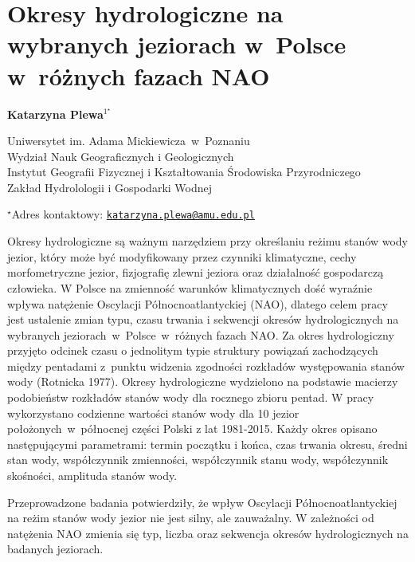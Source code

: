 \documentclass[\main/boa.tex]{subfiles}
\begin{document}
\sloppy


\section{Okresy hydrologiczne na wybranych jeziorach w~Polsce w~różnych fazach NAO}


\begin{center}
  {\bf {} Katarzyna Plewa$^{1^\star}$}
\end{center}

\vskip 0.3cm

\begin{affiliations}
\begin{enumerate}
\begin{minipage}{0.915\textwidth}
\centering
\item Uniwersytet im. Adama Mickiewicza~w~Poznaniu\\ Wydział Nauk Geograficznych i Geologicznych\\ Instytut Geografii Fizycznej i Kształtowania Środowiska Przyrodniczego \\Zakład Hydrolologii i Gospodarki Wodnej
\end{minipage}
\end{enumerate}
$^\star$Adres kontaktowy: \href{mailto:katarzyna.plewa@amu.edu.pl}{\nolinkurl{katarzyna.plewa@amu.edu.pl}}\\
\end{affiliations}

\vskip 0.5cm


\vskip 0.5cm

Okresy hydrologiczne są ważnym narzędziem przy określaniu reżimu stanów wody jezior, który może być modyfikowany przez czynniki klimatyczne, cechy morfometryczne jezior, fizjografię zlewni jeziora oraz działalność gospodarczą człowieka. W Polsce na zmienność warunków klimatycznych dość wyraźnie wpływa natężenie Oscylacji Północnoatlantyckiej (NAO), dlatego celem pracy jest ustalenie zmian typu, czasu trwania i sekwencji okresów hydrologicznych na wybranych jeziorach~w~Polsce~w~różnych fazach NAO. Za okres hydrologiczny przyjęto odcinek czasu o jednolitym typie struktury powiązań zachodzących między pentadami z~punktu widzenia zgodności rozkładów występowania stanów wody (Rotnicka 1977). Okresy hydrologiczne wydzielono na podstawie macierzy podobieństw rozkładów stanów wody dla rocznego zbioru pentad. W pracy wykorzystano codzienne wartości stanów wody dla 10 jezior położonych~w~północnej części Polski z lat 1981-2015. Każdy okres opisano następującymi parametrami: termin początku i końca, czas trwania okresu, średni stan wody, współczynnik zmienności, współczynnik stanu wody, współczynnik skośności, amplituda stanów wody.

Przeprowadzone badania potwierdziły, że wpływ Oscylacji Północnoatlantyckiej na reżim stanów wody jezior nie jest silny, ale zauważalny. W zależności od natężenia NAO zmienia się typ, liczba oraz sekwencja okresów hydrologicznych na badanych jeziorach.
\end{document}
